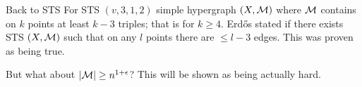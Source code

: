 \begin{topic}{Back to STS}
	For STS $(v,3,1,2)$ simple hypergraph $(X, \mathcal{M})$ where $\mathcal{M}$ contains on $k$ points at least $k-3$ triples; that is for $k \geq 4$. Erd\H os stated if there exists STS $(X, \mathcal{M})$ such that on any $l$ points there are $\leq l-3$ edges. This was proven as being true.
	
	But what about $|\mathcal{M}| \geq n^{1 + \epsilon}$? This will be shown as being actually hard.
\end{topic}